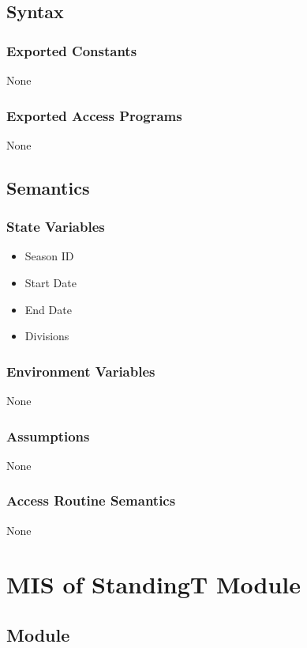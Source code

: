 \documentclass[12pt, titlepage]{article}
\begin{document}
\subsection{Syntax}

\subsubsection{Exported Constants} None

\subsubsection{Exported Access Programs} None

\subsection{Semantics}

\subsubsection{State Variables}
\begin{itemize}
  \item Season ID
  \item Start Date
  \item End Date
  \item Divisions
\end{itemize}

\subsubsection{Environment Variables}

None

\subsubsection{Assumptions}

None
\subsubsection{Access Routine Semantics}

None

\section{MIS of StandingT Module}
\label{StandingT}

\subsection{Module}
\end{document}
